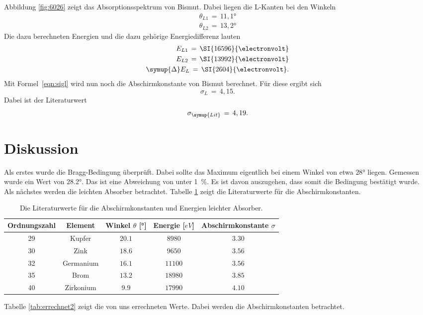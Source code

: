 \documentclass[
  bibliography=totoc,     %
  captions=tableheading,  %
  titlepage=firstiscover, %
]{scrartcl}
\begin{document}
\noindent
Abbildung \ref{fig:6026} zeigt das Absorptionsspektrum von Bismut. Dabei liegen die L-Kanten bei den Winkeln
\begin{align*}
  \theta_{L1}\,=\,11,1° \\
  \theta_{L2}\,=\,13,2°
\end{align*}
Die dazu berechneten Energien und die dazu gehörige Energiedifferenz lauten
\begin{align*}
  E_{L1}\,=\,\SI{16596}{\electronvolt} \\
  E_{L2}\,=\,\SI{13992}{\electronvolt} \\
  \symup{\Delta} E_L\,=\,\SI{2604}{\electronvolt}.
\end{align*}
Mit Formel~\eqref{eqn:sigl} wird nun noch die Abschirmkonstante von Bismut berechnet. Für diese ergibt sich
\begin{equation*}
  \sigma_L\,=\,4,15.
\end{equation*}
Dabei ist der Literaturwert
\begin{equation*}
  \sigma_{\symup{Lit}}\,=\,4,19.
\end{equation*}
\newpage
\section{Diskussion}
\label{sec:diskussion}
Als erstes wurde die Bragg-Bedingung überprüft. Dabei sollte das Maximum eigentlich bei einem Winkel von etwa $28°$ liegen. Gemessen wurde ein Wert von $28.2°$. Das ist eine Abweichung von unter \SI{1}{\percent}. Es ist davon auszugehen, dass somit die Bedingung bestätigt wurde.
Als nächstes werden die leichten Absorber betrachtet. Tabelle \ref{tab:literaturwerte} zeigt die Literaturwerte \cite{wissen} für die Abschirmkonstanten.
\begin{table}[H]
	\begin{center}
	\caption{Die Literaturwerte für die Abschirmkonstanten und Energien leichter Absorber.}
	\label{tab:literaturwerte}
		\begin{tabular}{ccccc}
			\toprule
			{Ordnungszahl} & {Element} & {Winkel $\theta$ [°]} & {Energie [$eV$]}
      & {Abschirmkonstante $\sigma$}\\
			\midrule
      29  & Kupfer & $20.1$ & $8980$ & $3.30$ \\
			30  & Zink & $18.6$ & $9650$ & $3.56$ \\
			32  & Germanium & $16.1$ & $11100$ & $3.56$\\
			35  & Brom & $13.2$ & $18980$ & $3.85$ \\
			40  & Zirkonium & $9.9$ & $17990$ & $4.10$ \\
			\bottomrule
		\end{tabular}
	\end{center}
\end{table}
\noindent
Tabelle \ref{tab:errechnet2} zeigt die von uns errechneten Werte. Dabei werden die Abschirmkonstanten betrachtet.
\end{document}
